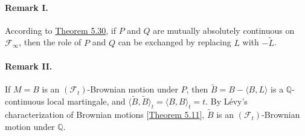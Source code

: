 \documentclass{article}
\numberwithin{equation}{section}
\newcommand{\bbQ}{\mathbb{Q}}
\theoremstyle{plain}
\theoremstyle{definition}
\begin{document}
\paragraph{Remark I.} According to \hyperref[thm:5.30]{Theorem 5.30}, if $P$ and $Q$ are mutually absolutely continuous on $\mathscr{F}_\infty$, then the role of $P$ and $Q$ can be exchanged by replacing $L$ with $-\widetilde{L}$.

\paragraph{Remark II.} If $M=B$ is an $(\mathscr{F}_t)$-Brownian motion under $P$, then $\widetilde{B}=B-\langle B,L\rangle$ is a $\bbQ$-continuous local martingale, and $\langle\widetilde{B},\widetilde{B}\rangle_t=\langle B,B\rangle_t=t$. By Lévy's characterization of Brownian motions [\hyperref[thm:5.11]{Theorem 5.11}], $\widetilde{B}$ is an $(\mathscr{F}_t)$-Brownian motion under $\bbQ$.
\end{document}
